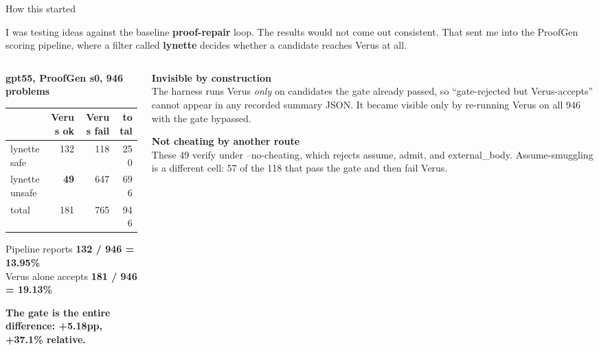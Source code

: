 \documentclass[aspectratio=169,10pt]{beamer}
\newcommand{\code}[1]{{\ttfamily #1}}
\newcommand{\hd}[1]{\textbf{\color{lgTeal}#1}}
\newcommand{\good}[1]{{\color{lgGreen}#1}}
\newcommand{\bad}[1]{{\color{lgRed}#1}}
\begin{document}
\begin{frame}{How this started}

\begin{callout}[lgAccent]
\scriptsize
I was testing ideas against the baseline \textbf{proof-repair} loop. The results would not come
out consistent. That sent me into the ProofGen scoring pipeline, where a filter called
\textbf{lynette} decides whether a candidate reaches Verus at all.
\end{callout}

\vspace{3pt}

\begin{columns}[T]
\begin{column}{0.46\textwidth}
{\scriptsize
\hd{gpt55, ProofGen s0, 946 problems}\\[2pt]
\begin{tabular}{lrrr}
\toprule
 & \textbf{Verus ok} & \textbf{Verus fail} & \textbf{total} \\
\midrule
lynette \good{safe}  & 132 & 118 & 250 \\
lynette \bad{unsafe} & \bad{\textbf{49}} & 647 & 696 \\
\midrule
total & 181 & 765 & 946 \\
\bottomrule
\end{tabular}
}

\vspace{4pt}
{\scriptsize
Pipeline reports \textbf{132 / 946 = 13.95\%}\\
Verus alone accepts \textbf{181 / 946 = 19.13\%}

\vspace{3pt}
\bad{\textbf{The gate is the entire difference: +5.18pp, +37.1\% relative.}}
}
\end{column}

\begin{column}{0.5\textwidth}
{\scriptsize
\hd{Invisible by construction}\\
The harness runs Verus \emph{only} on candidates the gate already passed, so
``gate-rejected but Verus-accepts'' cannot appear in any recorded summary JSON. It became
visible only by re-running Verus on all 946 with the gate bypassed.

\vspace{5pt}
\hd{Not cheating by another route}\\
These 49 verify under \code{--no-cheating}, which rejects \code{assume}, \code{admit}, and
\code{external\_body}. Assume-smuggling is a different cell: 57 of the 118 that pass the gate
and then fail Verus.
}
\end{column}
\end{columns}

\end{frame}
\end{document}
